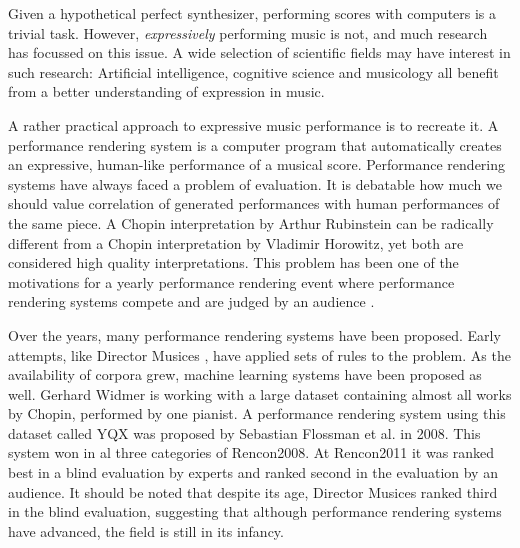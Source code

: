 \documentclass[a4paper,10pt]{article}
\begin{document}
Given a hypothetical perfect synthesizer, performing scores with computers is a trivial task. However, \textit{expressively} performing music is not, and much research has focussed on this issue. A wide selection of scientific fields may have interest in such research: Artificial intelligence, cognitive science and musicology all benefit from a better understanding of expression in music. 


A rather practical approach to expressive music performance is to recreate it. A performance rendering system is a computer program that automatically creates an expressive, human-like performance of a musical score. Performance rendering systems have always faced a problem of evaluation. It is debatable how much we should value correlation of generated performances with human performances of the same piece. A Chopin interpretation by Arthur Rubinstein can be radically different from a Chopin interpretation by Vladimir Horowitz, yet both are considered high quality interpretations. This problem has been one of the motivations for a yearly performance rendering event where performance rendering systems compete and are judged by an audience \cite{hiraga2002rencon}. 

Over the years, many performance rendering systems have been proposed. Early attempts, like Director Musices \cite{friberg2000generating}, have applied sets of rules to the problem. As the availability of corpora grew, machine learning systems have been proposed as well. Gerhard Widmer is working with a large dataset containing almost all works by Chopin, performed by one pianist. A performance rendering system using this dataset called YQX \cite{yqx} was proposed by Sebastian Flossman et al. in 2008. This system won in al three categories of Rencon2008. At Rencon2011 it was ranked best in a blind evaluation by experts and ranked second in the evaluation by an audience. It should be noted that despite its age, Director Musices ranked third in the blind evaluation, suggesting that although performance rendering systems have advanced, the field is still in its infancy.
\end{document}
